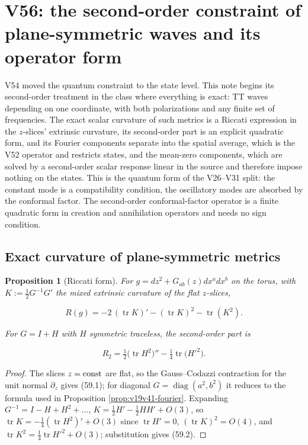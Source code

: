 \documentclass[11pt]{article}
\newtheorem{proposition}[theorem]{Proposition}
\theoremstyle{remark}
\begin{document}
\section{V56: the second-order constraint of plane-symmetric waves and its operator form}
\label{sec:v19v56}

V54 moved the quantum constraint to the state level.  This note begins
its second-order treatment in the class where everything is exact: TT
waves depending on one coordinate, with both polarizations and any
finite set of frequencies.  The exact scalar curvature of such metrics
is a Riccati expression in the \(z\)-slices' extrinsic curvature, its
second-order part is an explicit quadratic form, and its Fourier
components separate into the spatial average, which is the V52 operator
and restricts states, and the mean-zero components, which are solved
by a second-order scalar response linear in the source and therefore
impose nothing on the states.  This is the quantum form of the V26--V31
split: the constant mode is a compatibility condition, the oscillatory
modes are absorbed by the conformal factor.  The second-order
conformal-factor operator is a finite quadratic form in creation and
annihilation operators and needs no sign condition.

\subsection{Exact curvature of plane-symmetric metrics}

\begin{proposition}[Riccati form]
\label{prop:v19v56-riccati}
For \(g=dz^2+G_{ab}(z)dx^adx^b\) on the torus, with
\(K:=\tfrac12G^{-1}G'\) the mixed extrinsic curvature of the flat
\(z\)-slices,

\[
 R(g)=-2\,(\operatorname{tr}K)'-(\operatorname{tr}K)^2-\operatorname{tr}(K^2).
                                                                    \tag{59.1}
\]

For \(G=I+H\) with \(H\) symmetric traceless, the second-order part is

\[
 R_2=\tfrac12\bigl(\operatorname{tr}H^2\bigr)''-\tfrac14\operatorname{tr}\bigl(H'^2\bigr).
                                                                    \tag{59.2}
\]
\end{proposition}

\begin{proof}
The slices \(z=\hbox{const}\) are flat, so the Gauss--Codazzi
contraction for the unit normal \(\partial_z\) gives (59.1); for
diagonal \(G=\operatorname{diag}(a^2,b^2)\) it reduces to the formula
used in Proposition \ref{prop:v19v41-fourier}.  Expanding
\(G^{-1}=I-H+H^2+\dots\), \(K=\tfrac12H'-\tfrac12HH'+O(3)\), so
\(\operatorname{tr}K=-\tfrac14(\operatorname{tr}H^2)'+O(3)\) since
\(\operatorname{tr}H'=0\), \((\operatorname{tr}K)^2=O(4)\), and
\(\operatorname{tr}K^2=\tfrac14\operatorname{tr}H'^2+O(3)\); substitution
gives (59.2).
\end{proof}
\end{document}
